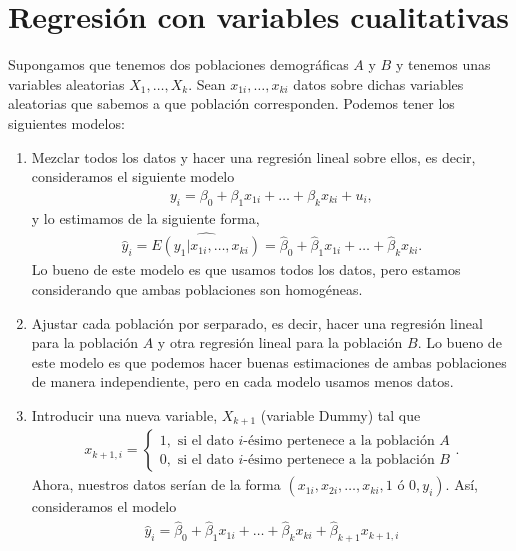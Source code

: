 \section{Regresión con variables cualitativas}
Supongamos que tenemos dos poblaciones demográficas $A$ y $B$ y tenemos unas variables aleatorias $X_1,\ldots,X_k$. Sean $x_{1i},\ldots,x_{ki}$ datos sobre dichas variables aleatorias que sabemos a que población corresponden. Podemos tener los siguientes modelos:
\begin{enumerate}
    \item Mezclar todos los datos y hacer una regresión lineal sobre ellos, es decir, consideramos el siguiente modelo
          \begin{align*}
              y_i = \beta_0 + \beta_1 x_{1i} +  \ldots + \beta_k x_{ki} + u_i,
          \end{align*}
          y lo estimamos de la siguiente forma,
          \begin{align*}
              \widehat{y}_i = \widehat{E(y_1 | x_{1i},\ldots,x_{ki})} = \widehat{\beta}_0 + \widehat{\beta}_1 x_{1i} + \ldots + \widehat{\beta}_k x_{ki}.
          \end{align*}
          Lo bueno de este modelo es que usamos todos los datos, pero estamos considerando que ambas poblaciones son homogéneas.
    \item Ajustar cada población por serparado, es decir, hacer una regresión lineal para la población $A$ y otra regresión lineal para la población $B$. Lo bueno de este modelo es que podemos hacer buenas estimaciones de ambas poblaciones de manera independiente, pero en cada modelo usamos menos datos.
    \item Introducir una nueva variable, $X_{k+1}$ (variable Dummy) tal que
          \begin{align*}
              x_{k+1,i} =  \begin{cases}
                               1, \text{ si el dato $i$-ésimo pertenece a la población $A$} \\
                               0, \text{ si el dato $i$-ésimo pertenece a la población $B$}
                           \end{cases} .
          \end{align*}
          Ahora, nuestros datos serían de la forma $(x_{1i}, x_{2i},\ldots, x_{ki}, \text{1 ó 0},y_i)$. Así, consideramos el modelo
          \begin{align*}
              \widehat{y}_i = \widehat{\beta}_0 + \widehat{\beta}_1 x_{1i} + \ldots + \widehat{\beta}_k x_{ki} + \widehat{\beta}_{k+1}x_{k+1,i}

\end{align*}
\end{enumerate}
